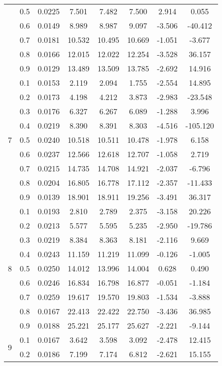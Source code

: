 \documentclass[11pt,a4paper]{report}
\begin{document}
\begin{longtable}{ | c | c || c | c | c | c | c | c | }
 & 0.5 & 0.0225 & 7.501 & 7.482 & 7.500 & 2.914 & 0.055 \\
 & 0.6 & 0.0149 & 8.989 & 8.987 & 9.097 & -3.506 & -40.412 \\
 & 0.7 & 0.0181 & 10.532 & 10.495 & 10.669 & -1.051 & -3.677 \\
 & 0.8 & 0.0166 & 12.015 & 12.022 & 12.254 & -3.528 & 36.157 \\
 & 0.9 & 0.0129 & 13.489 & 13.509 & 13.785 & -2.692 & 14.916 \\
 \hline
\multirow{9}{*}{7} & 0.1 & 0.0153 & 2.119 & 2.094 & 1.755 & -2.554 & 14.895 \\
 & 0.2 & 0.0173 & 4.198 & 4.212 & 3.873 & -2.983 & -23.548 \\
 & 0.3 & 0.0176 & 6.327 & 6.267 & 6.089 & -1.288 & 3.996 \\
 & 0.4 & 0.0219 & 8.390 & 8.391 & 8.303 & -4.516 & -105.120 \\
 & 0.5 & 0.0240 & 10.518 & 10.511 & 10.478 & -1.978 & 6.158 \\
 & 0.6 & 0.0237 & 12.566 & 12.618 & 12.707 & -1.058 & 2.719 \\
 & 0.7 & 0.0215 & 14.735 & 14.708 & 14.921 & -2.037 & -6.796 \\
 & 0.8 & 0.0204 & 16.805 & 16.778 & 17.112 & -2.357 & -11.433 \\
 & 0.9 & 0.0139 & 18.901 & 18.911 & 19.256 & -3.491 & 36.317 \\
 \hline
\multirow{9}{*}{8} & 0.1 & 0.0193 & 2.810 & 2.789 & 2.375 & -3.158 & 20.226 \\
 & 0.2 & 0.0213 & 5.577 & 5.595 & 5.235 & -2.950 & -19.786 \\
 & 0.3 & 0.0219 & 8.384 & 8.363 & 8.181 & -2.116 & 9.669 \\
 & 0.4 & 0.0243 & 11.159 & 11.219 & 11.099 & -0.126 & -1.005 \\
 & 0.5 & 0.0250 & 14.012 & 13.996 & 14.004 & 0.628 & 0.490 \\
 & 0.6 & 0.0246 & 16.834 & 16.798 & 16.877 & -0.051 & -1.184 \\
 & 0.7 & 0.0259 & 19.617 & 19.570 & 19.803 & -1.534 & -3.888 \\
 & 0.8 & 0.0167 & 22.413 & 22.422 & 22.750 & -3.436 & 36.985 \\
 & 0.9 & 0.0188 & 25.221 & 25.177 & 25.627 & -2.221 & -9.144 \\
 \hline
\multirow{9}{*}{9} & 0.1 & 0.0167 & 3.642 & 3.598 & 3.092 & -2.478 & 12.415 \\
 & 0.2 & 0.0186 & 7.199 & 7.174 & 6.812 & -2.621 & 15.155 \\

\end{longtable}
\end{document}

